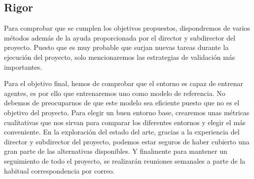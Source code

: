\subsection{Rigor}
Para comprobar que se cumplen los objetivos propuestos, dispondremos de varios métodos además de la ayuda proporcionada por el director y subdirector del proyecto. Puesto que es muy probable que surjan nuevas tareas durante la ejecución del proyecto, solo mencionaremos las estrategias de validación más importantes. 

Para el objetivo final, hemos de comprobar que el entorno es capaz de entrenar agentes, es por ello que entrenaremos uno como modelo de referencia. No debemos de preocuparnos de que este modelo sea eficiente puesto que no es el objetivo del proyecto. Para elegir un buen entorno base, crearemos unas métricas cualitativas que nos sirvan para comparar los diferentes entornos y elegir el más conveniente. En la exploración del estado del arte, gracias a la experiencia del director y subdirector del proyecto, podemos estar seguros de haber cubierto una gran parte de las alternativas disponibles. Y finalmente para mantener un seguimiento de todo el proyecto, se realizarán reuniones semanales a parte de la habitual correspondencia por correo.

 
 